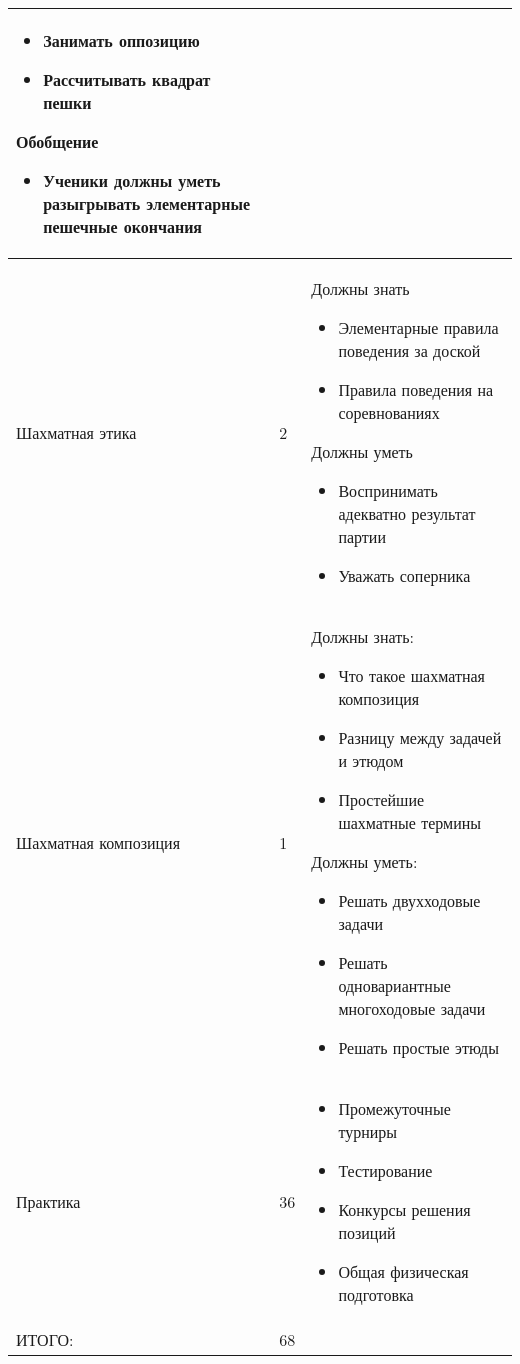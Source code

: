\begin{center}
\begin{longtable}{ p{} | p{} | p{} }
\begin{itemize}
\item Занимать оппозицию
\item Рассчитывать квадрат пешки
\end{itemize}
Обобщение
\begin{itemize}
\item Ученики должны уметь разыгрывать элементарные пешечные окончания
\end{itemize} \\ \hline
Шахматная этика & 2 & Должны знать
\begin{itemize}
\item Элементарные правила поведения за доской
\item Правила поведения на соревнованиях
\end{itemize}
Должны уметь
\begin{itemize}
\item Воспринимать адекватно результат партии
\item Уважать соперника
\end{itemize} \\ \hline
Шахматная композиция & 1 & Должны знать:
\begin{itemize}
\item Что такое шахматная композиция
\item Разницу между задачей и этюдом
\item Простейшие шахматные термины
\end{itemize}
Должны уметь:
\begin{itemize}
\item Решать двухходовые задачи
\item Решать одновариантные многоходовые задачи
\item Решать простые этюды
\end{itemize} \\ \hline
Практика & 36 & \begin{itemize}
\item Промежуточные турниры
\item Тестирование 
\item Конкурсы решения позиций
\item Общая физическая подготовка
\end{itemize} \\ \hline
ИТОГО: & 68 & \\
\end{longtable}
\end{center}

\clearpage
